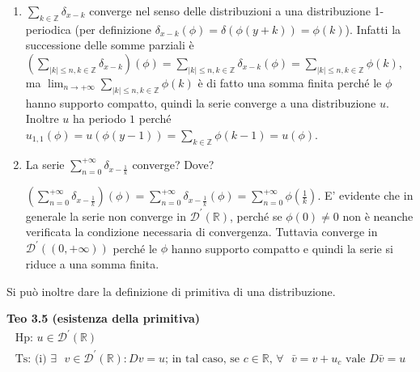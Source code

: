 \documentclass{article}
\begin{document}
\begin{enumerate}
\item $\sum_{k\in 
\mathbb{Z}
}\delta _{x-k}$ converge nel senso delle distribuzioni a una distribuzione
1-periodica (per definizione $\delta _{x-k}\left( \phi \right) =\delta
\left( \phi \left( y+k\right) \right) =\phi \left( k\right) $). Infatti la
successione delle somme parziali \`{e} $\left( \sum_{\left\vert k\right\vert
\leq n,k\in 
\mathbb{Z}
}\delta _{x-k}\right) \left( \phi \right) =\sum_{\left\vert k\right\vert
\leq n,k\in 
\mathbb{Z}
}\delta _{x-k}\left( \phi \right) =\sum_{\left\vert k\right\vert \leq n,k\in 
\mathbb{Z}
}\phi \left( k\right) $, ma $\lim_{n\rightarrow +\infty }\sum_{\left\vert
k\right\vert \leq n,k\in 
\mathbb{Z}
}\phi \left( k\right) $ \`{e} di fatto una somma finita perch\'{e} le $\phi $
hanno supporto compatto, quindi la serie converge a una distribuzione $u$.
Inoltre $u$ ha periodo $1$ perch\'{e} $u_{1,1}\left( \phi \right) =u\left(
\phi \left( y-1\right) \right) =\sum_{k\in 
\mathbb{Z}
}\phi \left( k-1\right) =u\left( \phi \right) $.

\item La serie $\sum_{n=0}^{+\infty }\delta _{x-\frac{1}{k}}$ converge? Dove?

$\left( \sum_{n=0}^{+\infty }\delta _{x-\frac{1}{k}}\right) \left( \phi
\right) =\sum_{n=0}^{+\infty }\delta _{x-\frac{1}{k}}\left( \phi \right)
=\sum_{n=0}^{+\infty }\phi \left( \frac{1}{k}\right) $. E' evidente che in
generale la serie non converge in $\mathcal{D}^{\prime }\left( 
\mathbb{R}
\right) $, perch\'{e} se $\phi \left( 0\right) \neq 0$ non \`{e} neanche
verificata la condizione necessaria di convergenza. Tuttavia converge in $%
\mathcal{D}^{\prime }\left( \left( 0,+\infty \right) \right) $ perch\'{e} le 
$\phi $ hanno supporto compatto e quindi la serie si riduce a una somma
finita.
\end{enumerate}

Si pu\`{o} inoltre dare la definizione di primitiva di una distribuzione.

\textbf{Teo 3.5 (esistenza della primitiva)}%
\begin{gather*}
\text{Hp: }u\in \mathcal{D}^{\prime }\left( 
\mathbb{R}
\right) \\
\text{Ts: (i) }\exists \text{ }v\in \mathcal{D}^{\prime }\left( 
\mathbb{R}
\right) :Dv=u\text{; in tal caso, se }c\in 
\mathbb{R}
\text{, }\forall \text{ }\bar{v}=v+u_{c}\text{ vale }D\bar{v}=u
\end{gather*}
\end{document}

